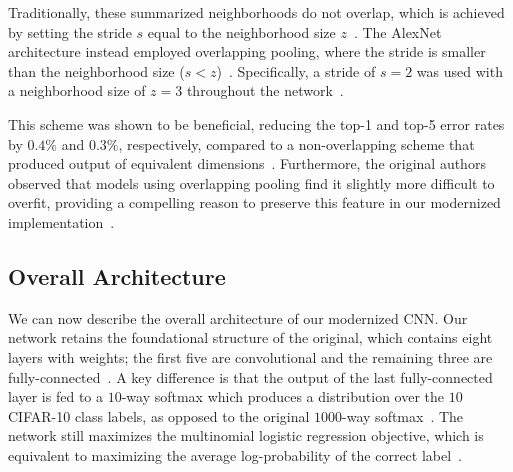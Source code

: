 \documentclass{article}
\begin{document}
Traditionally, these summarized neighborhoods do not overlap, which is achieved by setting the stride $s$ equal to the neighborhood size $z$~\cite{krizhevsky2012imagenet}. The AlexNet architecture instead employed overlapping pooling, where the stride is smaller than the neighborhood size ($s < z$)~\cite{krizhevsky2012imagenet}. Specifically, a stride of $s = 2$ was used with a neighborhood size of $z = 3$ throughout the network~\cite{krizhevsky2012imagenet}.

This scheme was shown to be beneficial, reducing the top-1 and top-5 error rates by $0.4\%$ and $0.3\%$, respectively, compared to a non-overlapping scheme that produced output of equivalent dimensions~\cite{krizhevsky2012imagenet}. Furthermore, the original authors observed that models using overlapping pooling find it slightly more difficult to overfit, providing a compelling reason to preserve this feature in our modernized implementation~\cite{krizhevsky2012imagenet}.

\subsection{Overall Architecture}
\noindent
We can now describe the overall architecture of our modernized CNN. Our network retains the foundational structure of the original, which contains eight layers with weights; the first five are convolutional and the remaining three are fully-connected~\cite{krizhevsky2012imagenet}. A key difference is that the output of the last fully-connected layer is fed to a $10$-way softmax which produces a distribution over the $10$ CIFAR-10 class labels, as opposed to the original $1000$-way softmax~\cite{krizhevsky2012imagenet}. The network still maximizes the multinomial logistic regression objective, which is equivalent to maximizing the average log-probability of the correct label~\cite{krizhevsky2012imagenet}.
\end{document}

